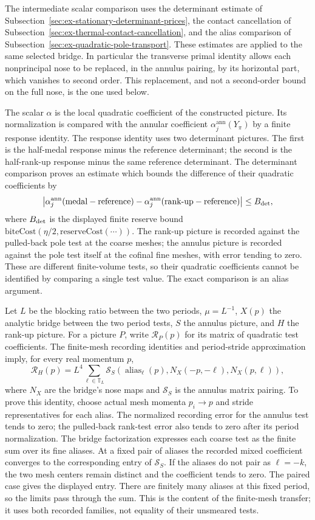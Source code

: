 The intermediate scalar comparison uses the determinant estimate of
Subsection~\ref{sec:ex-stationary-determinant-prices}, the contact cancellation
of Subsection~\ref{sec:ex-thermal-contact-cancellation}, and the alias
comparison of Subsection~\ref{sec:ex-quadratic-pole-transport}. These estimates
are applied to the same selected bridge. In particular the transverse
primal identity allows each nonprincipal nose to be replaced, in the
annulus pairing, by its horizontal part, which vanishes to second order.
This replacement, and not a second-order bound on the full nose, is the
one used below.

The scalar $\alpha$ is the local quadratic coefficient of the constructed
picture. Its normalization is compared with the annular coefficient
$\alpha^{\mathrm{ann}}_j(Y_\pi)$ by a finite response identity. The response identity
uses two determinant pictures. The first is the half-medal response minus
the reference determinant; the second is the half-rank-up response minus
the same reference determinant. The determinant comparison proves an estimate which
bounds the difference of their quadratic coefficients by
\[
 \left|\alpha^{\mathrm{ann}}_j(\text{medal}-\text{reference})
       -\alpha^{\mathrm{ann}}_j(\text{rank-up}-\text{reference})\right|
 \leq B_{\rm det},
\]
where $B_{\rm det}$ is the displayed finite reserve bound
$\mathrm{biteCost}(\eta/2,\mathrm{reserveCost}(\cdots))$. The rank-up
picture is recorded against the pulled-back pole test at the coarse meshes;
the annulus picture is recorded against the pole test itself at the cofinal
fine meshes, with error tending to zero. These are different finite-volume
tests, so their quadratic coefficients cannot be identified by comparing a
single test value. The exact comparison is an alias argument.

Let $L$ be the blocking ratio between the two periods, $\mu=L^{-1}$, $X(p)$ the analytic bridge
between the two period tests, $S$ the annulus picture, and $H$ the rank-up
picture. For a picture $P$, write $\mathcal R_P(p)$ for its matrix of
quadratic test coefficients. The finite-mesh recording identities and
period-stride approximation imply, for every real momentum $p$,
\[
 \mathcal R_H(p)=L^4\sum_{\ell\in\mathbb T_L}
  \mathcal S_S\!\left(\operatorname{alias}_\ell(p),
     N_X(-p,-\ell),N_X(p,\ell)\right),
\]
where $N_X$ are the bridge's nose maps and $\mathcal S_S$ is the annulus
matrix pairing. To prove this identity, choose actual mesh momenta $p_i\to p$
and stride representatives for each alias. The normalized recording error
for the annulus test tends to zero; the pulled-back rank-test error also
tends to zero after its period normalization. The bridge factorization
expresses each coarse test as the finite sum over its fine aliases. At a
fixed pair of aliases the recorded mixed coefficient converges to the
corresponding entry of $\mathcal S_S$. If the aliases do not pair as
$\ell=-k$, the two mesh centers remain distinct and the coefficient tends
to zero. The paired case gives the displayed entry. There are finitely many
aliases at this fixed period, so the limits pass through the sum. This is
the content of the finite-mesh transfer; it uses both recorded families,
not equality of their unsmeared tests.

